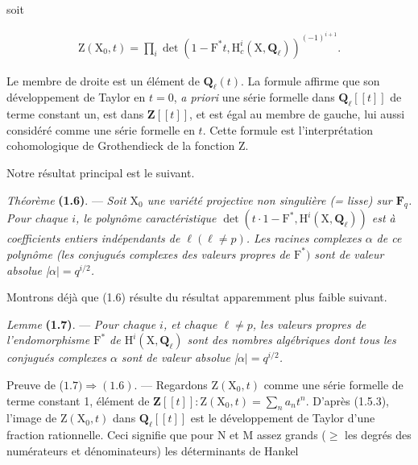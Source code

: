 \documentclass[10pt,leqno]{article}
\begin{document}
\noindent soit\par

\begin{equation*}\begin{gathered}\mathrm{Z}(\mathrm{X}_{0},t) = \prod _{i} \operatorname{det}(1- \mathrm{F}^{*}t, \mathrm{H}_{c}^{i}(\mathrm{X},\mathbf{Q}_{\ell }))^{(- 1)^{i+1}}.\end{gathered}\tag{1.5.4}\end{equation*}

\noindent Le membre de droite est un élément de \(\mathbf{Q}_{\ell }(t)\). La formule affirme que son développement de Taylor en \(t=0\), \emph{a priori} une série formelle dans \(\mathbf{Q}_{\ell }[[t]]\) de terme constant un, est dans \(\mathbf{Z}[[t]]\), et est égal au membre de gauche, lui aussi considéré comme une série formelle en \(t\). Cette formule est l’interprétation cohomologique de Grothendieck de la fonction \(\mathrm{Z}\).\par

\noindent Notre résultat principal est le suivant.\par

\noindent \emph{Théorème} \textbf{(1.6)}. — {\itshape Soit \(\mathrm{X}_{0}\) une variété projective non singulière (= lisse) sur \(\mathbf{F}_{q}\). Pour chaque \(i\), le polynôme caractéristique \(\operatorname{det}(t\cdot 1- \mathrm{F}^{*}, \mathrm{H}^{i}(\mathrm{X},\mathbf{Q}_{\ell }))\) est à coefficients entiers indépendants de \(\ell  (\ell \ne p)\). Les racines complexes \(\alpha \) de ce polynôme (les conjugués complexes des valeurs propres de \(\mathrm{F}^{*})\) sont de valeur absolue |\(\alpha |=q^{i/2}\).}\par

\noindent Montrons déjà que (1.6) résulte du résultat apparemment plus faible suivant.\par

\noindent \emph{Lemme} \textbf{(1.7)}. — {\itshape Pour chaque \(i\), et chaque \(\ell \ne p\), les valeurs propres de l’endomorphisme \(\mathrm{F}^{*}\) de \(\mathrm{H}^{i}(\mathrm{X},\mathbf{Q}_{\ell })\) sont des nombres algébriques dont tous les conjugués complexes \(\alpha \) sont de valeur absolue |\(\alpha |=q^{i/2}\).}\par

\noindent Preuve de (\(1.7) \Rightarrow  (1.6)\). — Regardons \(\mathrm{Z}(\mathrm{X}_{0},t)\) comme une série formelle de terme constant 1, élément de \(\mathbf{Z}[[t]] : \mathrm{Z}(\mathrm{X}_{0},t)=\sum _{n} a_{n} t^{n}\). D’après (1.5.3), l’image de \(\mathrm{Z}(\mathrm{X}_{0},t)\) dans \(\mathbf{Q}_{\ell }[[t]]\) est le développement de Taylor d’une fraction rationnelle. Ceci signifie que pour \(\mathrm{N}\) et \(\mathrm{M}\) assez grands (\(\geq \) les degrés des numérateurs et dénominateurs) les déterminants de Hankel\par
\end{document}
